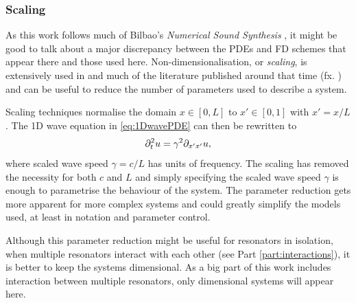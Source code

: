 \subsubsection{Scaling}
As this work follows much of Bilbao's \textit{Numerical Sound Synthesis} \cite{theBible}, it might be good to talk about a major discrepancy between the PDEs and FD schemes that appear there and those used here. Non-dimensionalisation, or \textit{scaling}, is extensively used in \cite{theBible} and much of the literature published around that time (fx. \cite{Bilbao2009Modular,Bilbao2009spring}) and can be useful to reduce the number of parameters used to describe a system.

Scaling techniques normalise the domain $x\in[0, L]$ to $x' \in [0, 1]$ with $x' = x/L$ . The 1D wave equation in \eqref{eq:1DwavePDE} can then be rewritten to
\begin{equation}\label{eq:scaled1Dwave}
    \partial_t^2 u = \gamma^2\partial_{x'x'}u,
\end{equation}
where scaled wave speed $\gamma = c/L$ has units of frequency. The scaling has removed the necessity for both $c$ and $L$ and simply specifying the scaled wave speed $\gamma$ is enough to parametrise the behaviour of the system. The parameter reduction gets more apparent for more complex systems and could greatly simplify the models used, at least in notation and parameter control. 

Although this parameter reduction might be useful for resonators in isolation, when multiple resonators interact with each other (see Part \ref{part:interactions}), it is better to keep the systems dimensional. As a big part of this work includes interaction between multiple resonators, only dimensional systems will appear here.

